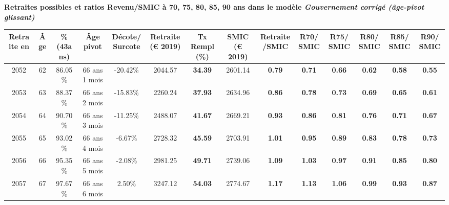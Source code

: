  \vspace{0.1cm} 
{\bf \noindent Retraites possibles et ratios Revenu/SMIC à 70, 75, 80, 85, 90 ans dans le modèle \emph{Gouvernement corrigé (âge-pivot glissant)}}  
 
\begin{adjustbox}{max width=\textwidth} 
\begin{tabular}[htb]{|c|c||c|c|c||c|c||c|c||c|c|c|c|c|} 
\hline 
 Retraite en &  Âge &  \%(43ans) &  Âge pivot &  Décote/Surcote &  Retraite (\euro{} 2019) &  Tx Rempl(\%) &  SMIC (\euro{} 2019) &  Retraite/SMIC &  R70/SMIC &  R75/SMIC &  R80/SMIC &  R85/SMIC &  R90/SMIC \\ 
\hline \hline 
 2052 &  62 &  86.05\% &  66 ans 1 mois &  -20.42\% &  2044.57 &  {\bf 34.39} &  2601.14 &  {\bf {\color{red} 0.79}} &  {\bf {\color{red} 0.71}} &  {\bf {\color{red} 0.66}} &  {\bf {\color{red} 0.62}} &  {\bf {\color{red} 0.58}} &  {\bf {\color{red} 0.55}} \\ 
\hline 
 2053 &  63 &  88.37\% &  66 ans 2 mois &  -15.83\% &  2260.24 &  {\bf 37.93} &  2634.96 &  {\bf {\color{red} 0.86}} &  {\bf {\color{red} 0.78}} &  {\bf {\color{red} 0.73}} &  {\bf {\color{red} 0.69}} &  {\bf {\color{red} 0.65}} &  {\bf {\color{red} 0.61}} \\ 
\hline 
 2054 &  64 &  90.70\% &  66 ans 3 mois &  -11.25\% &  2488.07 &  {\bf 41.67} &  2669.21 &  {\bf {\color{red} 0.93}} &  {\bf {\color{red} 0.86}} &  {\bf {\color{red} 0.81}} &  {\bf {\color{red} 0.76}} &  {\bf {\color{red} 0.71}} &  {\bf {\color{red} 0.67}} \\ 
\hline 
 2055 &  65 &  93.02\% &  66 ans 4 mois &  -6.67\% &  2728.32 &  {\bf 45.59} &  2703.91 &  {\bf 1.01} &  {\bf {\color{red} 0.95}} &  {\bf {\color{red} 0.89}} &  {\bf {\color{red} 0.83}} &  {\bf {\color{red} 0.78}} &  {\bf {\color{red} 0.73}} \\ 
\hline 
 2056 &  66 &  95.35\% &  66 ans 5 mois &  -2.08\% &  2981.25 &  {\bf 49.71} &  2739.06 &  {\bf 1.09} &  {\bf 1.03} &  {\bf {\color{red} 0.97}} &  {\bf {\color{red} 0.91}} &  {\bf {\color{red} 0.85}} &  {\bf {\color{red} 0.80}} \\ 
\hline 
 2057 &  67 &  97.67\% &  66 ans 6 mois &  2.50\% &  3247.12 &  {\bf 54.03} &  2774.67 &  {\bf 1.17} &  {\bf 1.13} &  {\bf 1.06} &  {\bf {\color{red} 0.99}} &  {\bf {\color{red} 0.93}} &  {\bf {\color{red} 0.87}} \\ 
\hline 
\hline 
\end{tabular} 
\end{adjustbox} 
 
